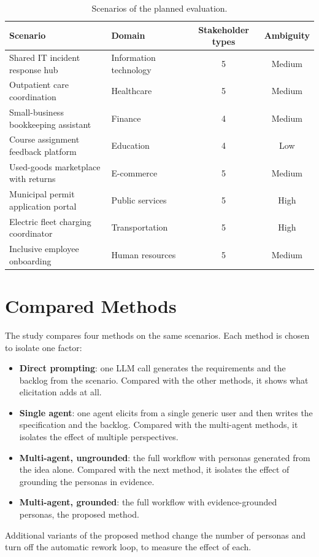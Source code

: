 \begin{table}[H]
    \centering
    \caption{Scenarios of the planned evaluation.}
    \label{tab:eval-scenarios}
    \begin{tabularx}{\linewidth}{|X|l|c|c|}
        \hline
        \textbf{Scenario} & \textbf{Domain} & \textbf{Stakeholder types} & \textbf{Ambiguity} \\
        \hline
        Shared IT incident response hub & Information technology & 5 & Medium \\
        Outpatient care coordination & Healthcare & 5 & Medium \\
        Small-business bookkeeping assistant & Finance & 4 & Medium \\
        Course assignment feedback platform & Education & 4 & Low \\
        Used-goods marketplace with returns & E-commerce & 5 & Medium \\
        Municipal permit application portal & Public services & 5 & High \\
        Electric fleet charging coordinator & Transportation & 5 & High \\
        Inclusive employee onboarding & Human resources & 5 & Medium \\
        \hline
    \end{tabularx}
\end{table}

\section{Compared Methods}
\label{sec:eval-baselines}

The study compares four methods on the same scenarios. Each method is chosen to isolate one factor:
\begin{itemize}
    \item \textbf{Direct prompting}: one LLM call generates the requirements and the backlog from the scenario. Compared with the other methods, it shows what elicitation adds at all.
    \item \textbf{Single agent}: one agent elicits from a single generic user and then writes the specification and the backlog. Compared with the multi-agent methods, it isolates the effect of multiple perspectives.
    \item \textbf{Multi-agent, ungrounded}: the full workflow with personas generated from the idea alone. Compared with the next method, it isolates the effect of grounding the personas in evidence.
    \item \textbf{Multi-agent, grounded}: the full workflow with evidence-grounded personas, the proposed method.
\end{itemize}
Additional variants of the proposed method change the number of personas and turn off the automatic rework loop, to measure the effect of each.

